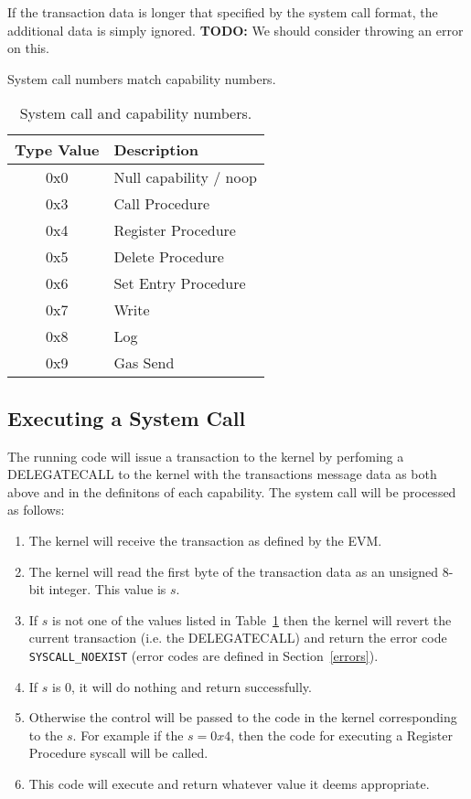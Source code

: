 \documentclass[english,a4paper]{article}
\begin{document}
If the transaction data is longer that specified by the system call format, the
additional data is simply ignored. \textbf{TODO:} We should consider throwing an
error on this.

System call numbers match capability numbers.

\begin{table}[H]
  \caption{System call and capability numbers.\label{syscall-numbers}}
  \centering{}%
  \begin{tabularx}{\textwidth}{c|X}
    \hline
    Type Value & Description\\
    \hline
    \hline
    0x0 & Null capability / noop \\
    0x3 & Call Procedure \\
    0x4 & Register Procedure \\
    0x5 & Delete Procedure \\
    0x6 & Set Entry Procedure \\
    0x7 & Write \\
    0x8 & Log \\
    0x9 & Gas Send \\
    \hline
  \end{tabularx}
\end{table}

\subsection{Executing a System Call}
The running code will issue a transaction to the kernel by perfoming a
DELEGATECALL to the kernel with the transactions message data as both above and
in the definitons of each capability. The system call will be processed as
follows:

\begin{enumerate}
  \item The kernel will receive the transaction as defined by the EVM.
  \item The kernel will read the first byte of the transaction data as an
  unsigned 8-bit integer. This value is $s$.
  \item If $s$ is not one of the values listed in Table~\ref{syscall-numbers}
  then the kernel will revert the current transaction (i.e. the DELEGATECALL)
  and return the error code \texttt{SYSCALL\_NOEXIST} (error codes are defined
  in Section~\ref{errors}).
  \item If $s$ is 0, it will do nothing and return successfully.
  \item Otherwise the control will be passed to the code in the kernel
  corresponding to the $s$. For example if the $s = 0x4$, then the code for
  executing a Register Procedure syscall will be called.
  \item This code will execute and return whatever value it deems appropriate.
\end{enumerate}
\end{document}
